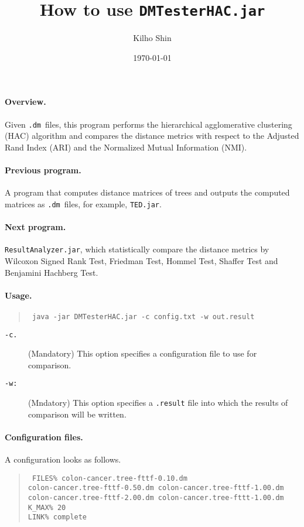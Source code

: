 \documentclass{article}
\title{How to use \texttt{DMTesterHAC.jar}}
\date{\today}
\author{Kilho Shin}
\newcommand\dm{\texttt{.dm}}
\begin{document}
\maketitle
\paragraph{Overview.}
Given \dm\ files, 
this program performs
the hierarchical agglomerative clustering (HAC) algorithm
and compares the distance metrics
with respect to the Adjusted Rand Index (ARI) and
the Normalized Mutual Information (NMI). 

\paragraph{Previous program.}

A program that computes distance matrices of trees and
outputs the computed matrices as \dm\ files,
for example, \texttt{TED.jar}.

\paragraph{Next program.}

\texttt{ResultAnalyzer.jar},
which statistically compare the distance metrics
by Wilcoxon Signed Rank Test, Friedman Test, Hommel Test,
Shaffer Test and Benjamini Hachberg Test.

\paragraph{Usage.}
\begin{quotation}\tt
  java -jar DMTesterHAC.jar -c config.txt -w out.result
\end{quotation}

\begin{description}
\item[\tt -c.] (Mandatory) 
  This option specifies a configuration file to use for comparison.
\item[\tt -w:] (Mndatory)
  This option specifies a \texttt{.result} file into which
  the results of comparison will be written.
\end{description} 
\paragraph{Configuration files.}
A configuration looks as follows.
\begin{quotation}\tt
  \noindent
  FILES\% colon-cancer.tree-fttf-0.10.dm\\
  colon-cancer.tree-fttf-0.50.dm colon-cancer.tree-fttf-1.00.dm colon-cancer.tree-fttf-2.00.dm colon-cancer.tree-fttt-1.00.dm\\
  K\_MAX\% 20\\
  LINK\% complete
\end{quotation}
\end{document}
